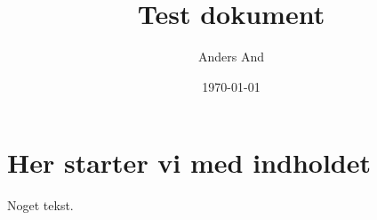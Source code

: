 \documentclass{article}
\title{Test dokument}
\author{Anders And}
\date{\today}
\begin{document}
\maketitle

\section{Her starter vi med indholdet}

Noget tekst.
\end{document}
